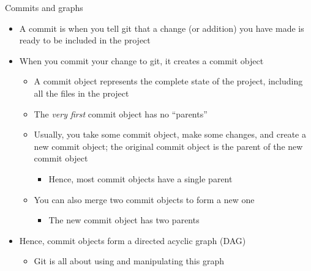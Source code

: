 \documentclass[aspectratio=169,11pt,t]{beamer}
\newcommand{\hl}[1]{\textcolor{accent}{#1}}              %
\begin{document}
\begin{frame}{Commits and graphs}
  \small
  \begin{itemize}
    \item A \hl{commit} is when you tell git that a change (or addition) you have made is ready
          to be included in the project
    \item When you commit your change to git, it creates a \hl{commit object}
      \begin{itemize}
        \item A commit object represents the complete state of the project, including all the
              files in the project
        \item The \emph{very first} commit object has no ``parents''
        \item Usually, you take some commit object, make some changes, and create a new commit
              object; the original commit object is the parent of the new commit object
          \begin{itemize}
            \item Hence, most commit objects have a single parent
          \end{itemize}
        \item You can also \hl{merge} two commit objects to form a new one
          \begin{itemize}
            \item The new commit object has two parents
          \end{itemize}
      \end{itemize}
    \item Hence, commit objects form a \hl{directed acyclic graph (DAG)}
      \begin{itemize}
        \item Git is all about using and manipulating this graph
      \end{itemize}
  \end{itemize}
\end{frame}
\end{document}
